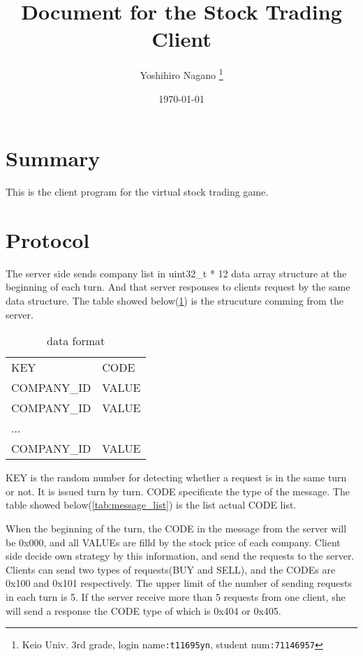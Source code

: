 \documentclass{article}
\title{
    Document for the Stock Trading Client
}
\author{
    Yoshihiro Nagano
    \thanks{Keio Univ. 3rd grade,
            login name\texttt{:t11695yn},
            student num\texttt{:71146957}}
}
\date{\today}
\newcommand{\tabref}[1]{\tablename\ref{#1}} %
\begin{document}
        \maketitle

        \section{Summary} %
        \label{sec:summary}

            This is the client program for the virtual stock trading game.



    \section{Protocol} %
    \label{sec:protocol}

        The server side sends company list in uint32\_t * 12 data array structure at the beginning of each turn.
        And that server responses to clients request by the same data structure.
        The table showed below(\tabref{tab:data_structure}) is the strucuture comming from the server.

        \begin{table}[h]
            \begin{center}
                \begin{tabular}{ll}
                KEY & CODE \\
                COMPANY\_ID & VALUE \\
                COMPANY\_ID & VALUE \\
                ... \\
                COMPANY\_ID & VALUE
                \end{tabular}
                \caption{data format}
                \label{tab:data_structure}
            \end{center}
        \end{table}

        KEY is the random number for detecting whether a request is in the same turn or not.
        It is issued turn by turn.
        CODE specificate the type of the message.
        The table showed below(\tabref{tab:message_list}) is the list actual CODE list.

        When the beginning of the turn,
        the CODE in the message from the server will be 0x000,
        and all VALUEs are filld by the stock price of each company.
        Client side decide own strategy by this information,
        and send the requests to the server.
        Clients can send two types of requests(BUY and SELL),
        and the CODEs are 0x100 and 0x101 respectively.
        The upper limit of the number of sending requests in each turn is 5.
        If the server receive more than 5 requests from one client,
        she will send a response the CODE type of which is 0x404 or 0x405.
\end{document}
